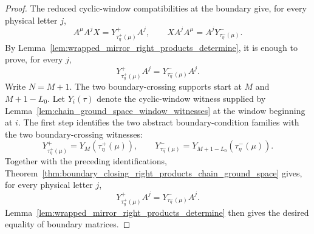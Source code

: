 \begin{proof}
    \notready
    The reduced cyclic-window compatibilities at the boundary give, for every
    physical letter $j$,
    \[
        A^{\mu} A^j X
        =
        Y^{+}_{\tau^{+}_{\eta}(\mu)} A^j,
        \qquad
        X A^j A^{\mu}
        =
        A^j Y^{-}_{\tau^{-}_{\eta}(\mu)}.
    \]
    By Lemma~\ref{lem:wrapped_mirror_right_products_determine}, it is enough to
    prove, for every $j$,
    \[
        Y^{+}_{\tau^{+}_{\eta}(\mu)} A^j
        =
        Y^{-}_{\tau^{-}_{\eta}(\mu)} A^j.
    \]
    Write $N=M+1$. The two boundary-crossing supports start at
    $M$ and $M+1-L_0$.  Let $Y_i(\tau)$
    denote the cyclic-window witness supplied by
    Lemma~\ref{lem:chain_ground_space_window_witnesses} at the window beginning at
    $i$.  The first step identifies the two abstract boundary-condition families
    with the two boundary-crossing witnesses:
    \[
        Y^{+}_{\tau^{+}_{\eta}(\mu)}
        =
        Y_M(\tau^{+}_{\eta}(\mu)),
        \qquad
        Y^{-}_{\tau^{-}_{\eta}(\mu)}
        =
        Y_{M+1-L_0}(\tau^{-}_{\eta}(\mu)).
    \]
    Together with the preceding identifications,
    Theorem~\ref{thm:boundary_closing_right_products_chain_ground_space}
    gives, for every physical letter $j$,
    \[
        Y^{+}_{\tau^{+}_{\eta}(\mu)} A^j
        =
        Y^{-}_{\tau^{-}_{\eta}(\mu)} A^j.
    \]
    Lemma~\ref{lem:wrapped_mirror_right_products_determine} then gives the
    desired equality of boundary matrices.
\end{proof}

